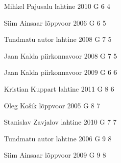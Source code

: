 \documentclass[11pt]{article}
\begin{document}
{Mihkel Pajusalu} %
{lahtine} %
{2010} %
{G 6} %
{4} %
{

\ifEngHint
\fi
}

{Siim Ainsaar} %
{lõppvoor} %
{2006} %
{G 6} %
{5} %
{

\ifEngHint
\fi
}

{Tundmatu autor} %
{lahtine} %
{2008} %
{G 7} %
{5} %
{

\ifEngHint
\fi
}

{Jaan Kalda} %
{piirkonnavoor} %
{2008} %
{G 7} %
{5} %
{

\ifEngHint
\fi
}

{Jaan Kalda} %
{piirkonnavoor} %
{2009} %
{G 6} %
{6} %
{

\ifEngHint
\fi
}

{Kristian Kuppart} %
{lahtine} %
{2011} %
{G 8} %
{6} %
{

\ifEngHint
\fi
}

{Oleg Košik} %
{lõppvoor} %
{2005} %
{G 8} %
{7} %
{

\ifEngHint
\fi
}

{Stanislav Zavjalov} %
{lahtine} %
{2010} %
{G 7} %
{7} %
{

\ifEngHint
\fi
}

{Tundmatu autor} %
{lahtine} %
{2006} %
{G 9} %
{8} %
{

\ifEngHint
\fi
}

{Siim Ainsaar} %
{lõppvoor} %
{2009} %
{G 9} %
{8} %
{

\ifEngHint
\fi
}
\end{document}
